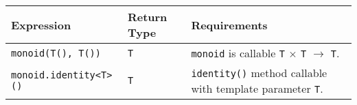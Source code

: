 \begin{tabularx}{\textwidth}{l l X}
\textbf{Expression} & \textbf{Return Type} & \textbf{Requirements}\\
\hline
\texttt{monoid(T(), T())} & \texttt{T} & \texttt{monoid} is callable \texttt{T} $\times$ \texttt{T} $\rightarrow$ \texttt{T}.\\
\hline
\texttt{monoid.identity<T>()} & \texttt{T} & \texttt{identity()} method callable with template parameter \texttt{T}.\\
\end{tabularx}
